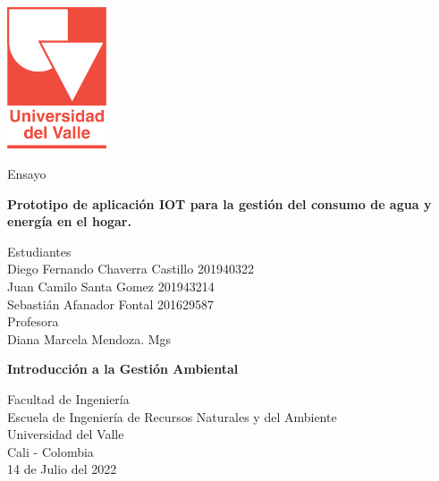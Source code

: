 \begin{titlepage}
    \begin{center}
        \vspace*{1cm}

        \begin{Huge}
        \end{Huge}

        \includegraphics[width=0.22\textwidth]{img/universidadDelValle.png}
        \vfill

        Ensayo

        \vfill
        \textbf{Prototipo de aplicación IOT para la gestión del consumo de agua y energía en el hogar.}\\
        \vfill
        
        Estudiantes\\
        Diego Fernando Chaverra Castillo 201940322\\
        Juan Camilo Santa Gomez 201943214\\
        Sebastián Afanador Fontal 201629587\\
        \vfill
        Profesora\\
        Diana Marcela Mendoza. Mgs
        
        
        \vfill

        \textbf{Introducción a la Gestión Ambiental}
        
        \vfill
           
        Facultad de Ingeniería\\
        Escuela de Ingeniería de Recursos Naturales y del Ambiente\\
        Universidad del Valle\\
        Cali - Colombia\\
        \vfill
        14 de Julio del 2022

    \end{center}
\end{titlepage}